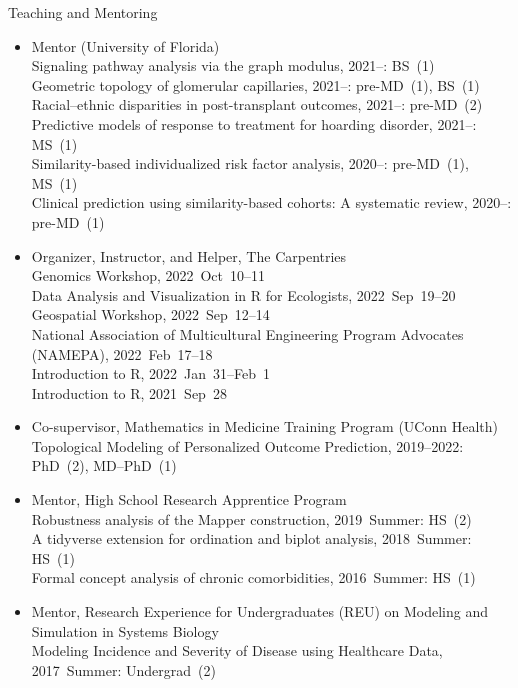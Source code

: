 \documentclass[10pt,a4paper]{article}
\begin{document}
\vspace{.25cm}
{\sc Teaching and Mentoring}
\begin{itemize}[label=$\circ$,nolistsep]
\item
Mentor (University of Florida) \\
Signaling pathway analysis via the graph modulus, 2021--: BS~(1) \\
Geometric topology of glomerular capillaries, 2021--: pre-MD~(1), BS~(1) \\
Racial--ethnic disparities in post-transplant outcomes, 2021--: pre-MD~(2) \\
Predictive models of response to treatment for hoarding disorder, 2021--: MS~(1) \\
Similarity-based individualized risk factor analysis, 2020--: pre-MD~(1), MS~(1) \\
Clinical prediction using similarity-based cohorts: A systematic review, 2020--: pre-MD~(1)
\item
Organizer, Instructor, and Helper, The Carpentries \\
Genomics Workshop, 2022~Oct~10--11 \\
Data Analysis and Visualization in R for Ecologists, 2022~Sep~19--20 \\
Geospatial Workshop, 2022~Sep~12--14 \\
National Association of Multicultural Engineering Program Advocates (NAMEPA), 2022~Feb~17--18 \\
Introduction to R, 2022~Jan~31--Feb~1 \\
Introduction to R, 2021~Sep~28
\item
Co-supervisor, Mathematics in Medicine Training Program (UConn Health) \\
Topological Modeling of Personalized Outcome Prediction, 2019--2022: PhD~(2), MD--PhD~(1)
\item
Mentor, High School Research Apprentice Program \\
Robustness analysis of the Mapper construction, 2019~Summer: HS~(2) \\
A tidyverse extension for ordination and biplot analysis, 2018~Summer: HS~(1) \\
Formal concept analysis of chronic comorbidities, 2016~Summer: HS~(1)
\item
Mentor, Research Experience for Undergraduates (REU) on Modeling and Simulation in Systems Biology \\
Modeling Incidence and Severity of Disease using Healthcare Data, 2017~Summer: Undergrad~(2) \\

\end{itemize}
\end{document}
